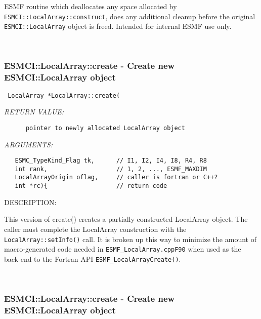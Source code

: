         ESMF routine which deallocates any space allocated by
        {\tt ESMCI::LocalArray::construct}, does any additional cleanup before
        the original {\tt ESMCI::LocalArray} object is freed.  Intended for
        internal ESMF use only.
   
 
\mbox{}\hrulefill\
 
\subsubsection [ESMCI::LocalArray::create] {ESMCI::LocalArray::create - Create new ESMCI::LocalArray object}


  
\begin{verbatim} LocalArray *LocalArray::create(\end{verbatim}{\em RETURN VALUE:}
\begin{verbatim}      pointer to newly allocated LocalArray object\end{verbatim}{\em ARGUMENTS:}
\begin{verbatim}   ESMC_TypeKind_Flag tk,      // I1, I2, I4, I8, R4, R8
   int rank,                   // 1, 2, ..., ESMF_MAXDIM
   LocalArrayOrigin oflag,     // caller is fortran or C++?
   int *rc){                   // return code\end{verbatim}
{\sf DESCRIPTION:\\ }


    This version of create() creates a partially constructed LocalArray
    object. The caller must complete the LocalArray construction with the
    {\tt LocalArray::setInfo()} call. It is broken up this way to minimize
    the amount of macro-generated code needed in {\tt ESMF\_LocalArray.cppF90}
    when used as the back-end to the Fortran API {\tt ESMF_LocalArrayCreate()}.
   
 
\mbox{}\hrulefill\
 
\subsubsection [ESMCI::LocalArray::create] {ESMCI::LocalArray::create - Create new ESMCI::LocalArray object}


